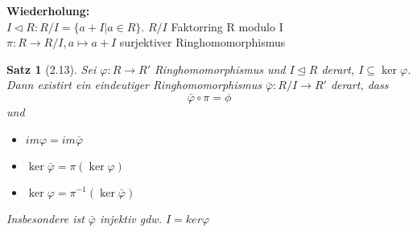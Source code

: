 \documentclass[10pt,a4paper]{article}
\newtheorem{satz}{Satz}
\begin{document}
\textbf{Wiederholung:}\\
$I \triangleleft R: R/I = \lbrace a + I | a \in R \rbrace$. $R/I$ Faktorring \glqq R modulo I\grqq \\
$\pi : R \rightarrow R/I, a \mapsto a+I$ surjektiver Ringhomomorphismus
\begin{satz}[2.13]
 Sei $\varphi: R \rightarrow R'$ Ringhomomorphismus und $I \trianglelefteq R$ derart, $I \subseteq \ker\varphi$. Dann existirt ein eindeutiger Ringhomomorphismus $\bar\varphi : R/I \rightarrow R'$ derart, dass
 $$\bar \varphi \circ \pi = \phi$$
 und \begin{itemize}
      \item $im \varphi = im \bar \varphi$
      \item $\ker \bar \varphi = \pi(\ker \varphi)$
      \item $\ker \varphi = \pi^{-1}(\ker \bar \varphi)$
     \end{itemize}

Insbesondere ist $\bar \varphi$ injektiv gdw. $I = ker \varphi$
\end{satz}
\end{document}
